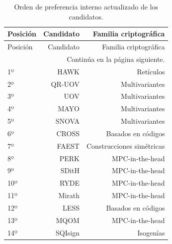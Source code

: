 \begingroup
\small
\setlength{\tabcolsep}{3pt}
\setlength{\LTcapwidth}{\textwidth}
\begin{longtable}{lrr}
\caption{Orden de preferencia interno actualizado de los candidatos.}\label{tab:eval-clasificacion}\\
\toprule
Posición & Candidato & Familia criptográfica \\
\midrule
\endfirsthead
\toprule
Posición & Candidato & Familia criptográfica \\
\midrule
\endhead
\midrule
\multicolumn{3}{r}{\small Continúa en la página siguiente.}\\
\endfoot
\bottomrule
\endlastfoot
{1º} & {HAWK} & {Retículos} \\
{2º} & {QR-UOV} & {Multivariantes} \\
{3º} & {UOV} & {Multivariantes} \\
{4º} & {MAYO} & {Multivariantes} \\
{5º} & {SNOVA} & {Multivariantes} \\
{6º} & {CROSS} & {Basados en códigos} \\
{7º} & {FAEST} & {Construcciones simétricas} \\
{8º} & {PERK} & {MPC-in-the-head} \\
{9º} & {SDitH} & {MPC-in-the-head} \\
{10º} & {RYDE} & {MPC-in-the-head} \\
{11º} & {Mirath} & {MPC-in-the-head} \\
{12º} & {LESS} & {Basados en códigos} \\
{13º} & {MQOM} & {MPC-in-the-head} \\
{14º} & {SQIsign} & {Isogenías} \\
\end{longtable}
\endgroup

